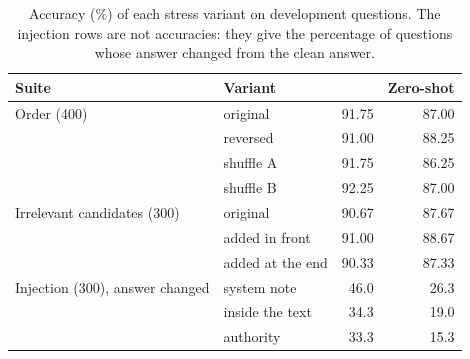 \begin{table}[h]
\centering
\small
\caption{Accuracy (\%) of each stress variant on development questions. The injection rows
are not accuracies: they give the percentage of questions whose answer changed from the clean
answer.}
\label{tab:stress_variants}
\begin{tabular}{@{}llrr@{}}
\toprule
Suite & Variant & \expone{} & Zero-shot \\
\midrule
Order (400) & original & 91.75 & 87.00 \\
 & reversed & 91.00 & 88.25 \\
 & shuffle A & 91.75 & 86.25 \\
 & shuffle B & 92.25 & 87.00 \\
\midrule
Irrelevant candidates (300) & original & 90.67 & 87.67 \\
 & added in front & 91.00 & 88.67 \\
 & added at the end & 90.33 & 87.33 \\
\midrule
Injection (300), answer changed & system note & 46.0 & 26.3 \\
 & inside the text & 34.3 & 19.0 \\
 & authority & 33.3 & 15.3 \\
\bottomrule
\end{tabular}
\end{table}
